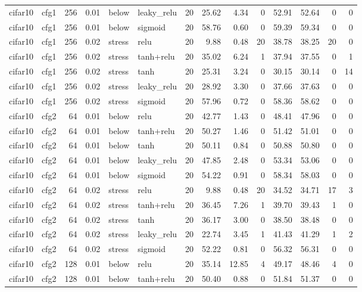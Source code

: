\begin{table}[htbp]
{\begin{tabular}{@{}llrrllrrrrrrrr@{}}
cifar10 & cfg1 & 256 & 0.01 & below & leaky\_relu & 20 & 25.62 & 4.34 & 0 & 52.91 & 52.64 & 0 & 0 \\
cifar10 & cfg1 & 256 & 0.01 & below & sigmoid & 20 & 58.76 & 0.60 & 0 & 59.39 & 59.34 & 0 & 0 \\
cifar10 & cfg1 & 256 & 0.02 & stress & relu & 20 & 9.88 & 0.48 & 20 & 38.78 & 38.25 & 20 & 0 \\
cifar10 & cfg1 & 256 & 0.02 & stress & tanh+relu & 20 & 35.02 & 6.24 & 1 & 37.94 & 37.55 & 0 & 1 \\
cifar10 & cfg1 & 256 & 0.02 & stress & tanh & 20 & 25.31 & 3.24 & 0 & 30.15 & 30.14 & 0 & 14 \\
cifar10 & cfg1 & 256 & 0.02 & stress & leaky\_relu & 20 & 28.92 & 3.30 & 0 & 37.66 & 37.63 & 0 & 0 \\
cifar10 & cfg1 & 256 & 0.02 & stress & sigmoid & 20 & 57.96 & 0.72 & 0 & 58.36 & 58.62 & 0 & 0 \\
cifar10 & cfg2 & 64 & 0.01 & below & relu & 20 & 42.77 & 1.43 & 0 & 48.41 & 47.96 & 0 & 0 \\
cifar10 & cfg2 & 64 & 0.01 & below & tanh+relu & 20 & 50.27 & 1.46 & 0 & 51.42 & 51.01 & 0 & 0 \\
cifar10 & cfg2 & 64 & 0.01 & below & tanh & 20 & 50.11 & 0.84 & 0 & 50.88 & 50.80 & 0 & 0 \\
cifar10 & cfg2 & 64 & 0.01 & below & leaky\_relu & 20 & 47.85 & 2.48 & 0 & 53.34 & 53.06 & 0 & 0 \\
cifar10 & cfg2 & 64 & 0.01 & below & sigmoid & 20 & 54.22 & 0.91 & 0 & 58.34 & 58.03 & 0 & 0 \\
cifar10 & cfg2 & 64 & 0.02 & stress & relu & 20 & 9.88 & 0.48 & 20 & 34.52 & 34.71 & 17 & 3 \\
cifar10 & cfg2 & 64 & 0.02 & stress & tanh+relu & 20 & 36.45 & 7.26 & 1 & 39.70 & 39.43 & 1 & 0 \\
cifar10 & cfg2 & 64 & 0.02 & stress & tanh & 20 & 36.17 & 3.00 & 0 & 38.50 & 38.48 & 0 & 0 \\
cifar10 & cfg2 & 64 & 0.02 & stress & leaky\_relu & 20 & 22.74 & 3.45 & 1 & 41.43 & 41.29 & 1 & 2 \\
cifar10 & cfg2 & 64 & 0.02 & stress & sigmoid & 20 & 52.22 & 0.81 & 0 & 56.32 & 56.31 & 0 & 0 \\
cifar10 & cfg2 & 128 & 0.01 & below & relu & 20 & 35.14 & 12.85 & 4 & 49.17 & 48.46 & 4 & 0 \\
cifar10 & cfg2 & 128 & 0.01 & below & tanh+relu & 20 & 50.40 & 0.88 & 0 & 51.84 & 51.37 & 0 & 0 \\

\end{tabular}}
\end{table}

